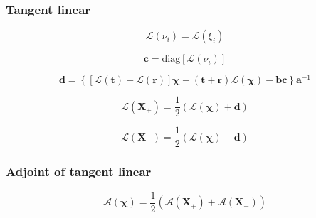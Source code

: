 \subsubsection{Tangent linear}
\label{sec:eigen_problem-invert_reduction_of_order-tangent_linear}

\begin{equation}
\mathcal{L}(\nu_{i}) = \mathcal{L}(\xi_{i})
\label{eq:eigen_problem-invert_reduction_of_order-forward_nu}
\end{equation}

\begin{equation}
\mathbf{c} = \mathrm{diag}[\mathcal{L}(\nu_{i})]
\label{eq:eigen_problem-invert_reduction_of_order-tangent_linear-c}
\end{equation}

\begin{equation}
\mathbf{d} = \left\{\left[\mathcal{L}(\mathbf{t}) + \mathcal{L}(\mathbf{r})\right]\boldsymbol{\chi} + (\mathbf{t} + \mathbf{r})\mathcal{L}(\boldsymbol{\chi}) - \mathbf{b}\mathbf{c}\right\}\mathbf{a}^{-1}
\label{eq:eigen_problem-invert_reduction_of_order-tangent_linear-d}
\end{equation}

\begin{equation}
\mathcal{L}(\mathbf{X}_{+}) = \frac{1}{2} (\mathcal{L}(\boldsymbol{\chi}) + \mathbf{d})
\label{eq:eigen_problem-invert_reduction_of_order-tangent_linear-y_p}
\end{equation}

\begin{equation}
\mathcal{L}(\mathbf{X}_{-}) = \frac{1}{2} (\mathcal{L}(\boldsymbol{\chi}) - \mathbf{d})
\label{eq:eigen_problem-invert_reduction_of_order-tangent_linear-y_m}
\end{equation}


%
\subsubsection{Adjoint of tangent linear}
\label{sec:eigen_problem-invert_reduction_of_order-adjoint_of_tangent_linear}

\begin{equation}
\mathcal{A}(\boldsymbol{\chi}) = \frac{1}{2} (\mathcal{A}(\mathbf{X}_{+}) + \mathcal{A}(\mathbf{X}_{-}))
\label{eq:eigen_problem-invert_reduction_of_order-adjoint_of_tangent_linear-chi_a}
\end{equation}

